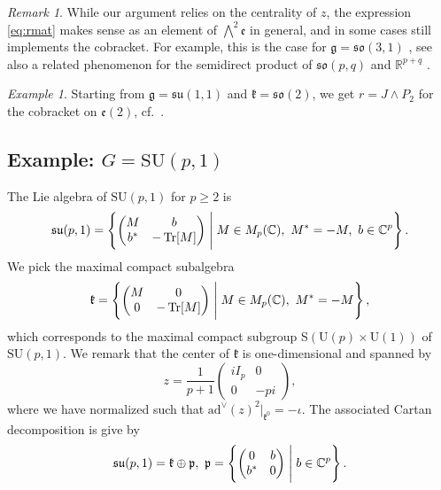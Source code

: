 \documentclass[a4paper,11pt]{amsart}
\newcommand{\R}{\mathbb R}
\newcommand{\C}{\mathbb C}
\newcommand{\fr}[1]{\mathfrak{#1}}
\newcommand{\ad}{\mathrm{ad}}
\newcommand{\SU}{\mathrm{SU}}
\newcommand{\medwedge}{{\textstyle\bigwedge}}
\theoremstyle{definition}
\theoremstyle{remark}
\newtheorem{rmk}[thm]{Remark}
\newtheorem{ex}[thm]{Example}
\begin{document}
\begin{rmk}
While our argument relies on the centrality of $z$, the expression \eqref{eq:rmat} makes sense as an element of $\medwedge^2 \fr{e}$ in general, and in some cases still implements the cobracket.
For example, this is the case for $\fr g = \fr{so}(3,1)$ \cite{MR1280372}, see also a related phenomenon for the semidirect product of $\fr{so}(p,q)$ and $\R^{p + q}$ .
\end{rmk}

\begin{ex}
Starting from $\fr{g} = \fr{su}(1,1)$ and $\fr{k} = \fr{so}(2)$, we get $r = J \wedge P_2$ for the cobracket on $\fr{e}(2)$, cf.~\cite{MR1267935}.
\end{ex}

\subsection{Example: \texorpdfstring{$G = \SU(p,1)$}{G = SU(p, 1)}}

The Lie algebra of $\SU(p,1)$ for $p\geq 2$ is
\[
\fr{su}(p,1) = \left\{
\begin{pmatrix}
M & b \\
b^* & - \Tr[M]
\end{pmatrix}
\Biggm| M\in M_p(\C) , ~ M^* = - M , ~ b \in \C^p \right\} .
\]
We pick the maximal compact subalgebra
\[
\fr{k} = \left\{ 
\begin{pmatrix}
M & 0 \\
0 & - \Tr[M]
\end{pmatrix}
\Biggm| M\in M_p(\C) , ~ M^* = - M  \right\} ,
\]
which corresponds to the maximal compact subgroup S$(\mathrm{U}(p)\times\mathrm{U}(1))$ of $\SU(p,1)$.
We remark that the center of $\fr{k}$ is one-dimensional and spanned by
\[
z = \frac{1}{p+1} \begin{pmatrix}
i I_p & 0\\
0 & - p i
\end{pmatrix},
\]
where we have normalized such that $\ad^\vee(z)^2|_{\fr{k}^0} = - \iota$.
The associated Cartan decomposition is give by
\[
\fr{su}(p,1) = \fr{k} \oplus \fr{p} , ~ \fr{p} = \left\{
\begin{pmatrix}
0 & b \\
b^* & 0 \end{pmatrix}
\Biggm| b \in \C^p \right\} .
\]
\end{document}
